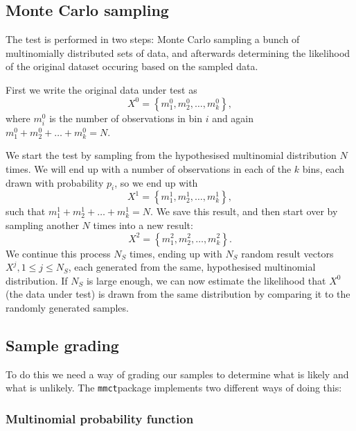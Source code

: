\documentclass{ol-softwaremanual}
\newcommand{\mmct}{\texttt{mmct}}
\begin{document}
\subsection{Monte Carlo sampling}

The test is performed in two steps: Monte Carlo sampling a bunch of 
multinomially distributed sets of data, and afterwards determining the 
likelihood of the original dataset occuring based on the sampled data.

First we write the original data under test as
\begin{equation}
X^0 = \left\{ m^0_1, m^0_2, \ldots , m^0_k \right\},
\end{equation}
where $m^0_i$ is the number of observations in bin $i$ and again 
$m^0_1+m^0_2+\ldots+m^0_k = N$.

We start the test by sampling from the hypothesised multinomial distribution 
$N$ times. 
We will end up with a number of observations in each of the $k$ bins, each 
drawn with probability $p_i$, so we end up with
\begin{equation}
X^1 = \left\{ m^1_1, m^1_2, \ldots , m^1_k \right\},
\end{equation}
such that $m^1_1 + m^1_2 + \ldots + m^1_k = N$. We save this result, and then 
start over by sampling another $N$ times into a new result:
\begin{equation}
X^2 = \left\{ m^2_1, m^2_2, \ldots , m^2_k \right\}.
\end{equation}
We continue this process $N_S$ times, ending up with $N_S$ random result 
vectors $X^j, 1\leq j \leq N_S$, each generated from the same, hypothesised 
multinomial distribution. If 
$N_S$ is large enough, we can now estimate the likelihood that $X^0$ (the data 
under test) is drawn 
from the same distribution by comparing it to the randomly generated samples.

\subsection{Sample grading}

To do this we need a way of grading our samples to determine what is likely and 
what is unlikely. The \mmct package implements two different ways of doing this:

\subsubsection{Multinomial probability function}
\end{document}
